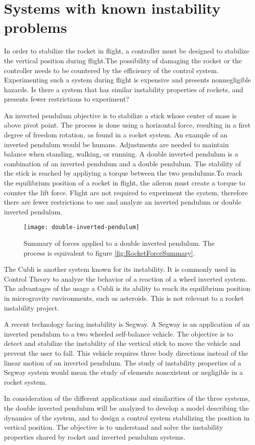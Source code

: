 \section{Systems with known instability problems}
\graphicspath{{figures/"Preanalysis&Requirement"/SimilarSystems/}}
In order to stabilize the rocket in flight, a controller must be designed to stabilize the vertical position during flight.The possibility of damaging the rocket or the controller needs to be countered by the efficiency of the control system. Experimenting such a system during flight is expensive and presents nonnegligible hazards.
Is there a system that has similar instability properties of rockets, and presents fewer restrictions to experiment?

An inverted pendulum objective is to stabilize a stick whose center of mass is above pivot point. The process is done using a horizontal force, resulting in a first degree of freedom rotation, as found in a rocket system. An example of an inverted pendulum would be humans. Adjustments are needed to maintain balance when standing, walking, or running. 
A double inverted pendulum is a combination of an inverted pendulum and a double pendulum. The stability of the stick is reached by appliying a torque between the two pendulums.To reach the equilibrium position of a rocket in flight, the aileron must create a torque to counter the lift force. Flight are not required to experiment the system, therefore there are fewer restrictions to use and analyze an inverted pendulum or double inverted pendulum. 

\begin{figure}[htbp]
	\centering
	\texttt{[image: double-inverted-pendulum]}
	\caption{Summary of forces applied to a double inverted pendulum. The process is equivalent to figure  \vref{fig:RocketForceSummary}.}
	\label{fig:DoubleInvertedPendulum}
\end{figure}


The Cubli is another system known for its instability. It is commonly used in Control Theory to analyze the behavior of a reaction of a wheel inverted system. The advantages of the usage a Cubli is its ability to reach its equilibrium position in microgravity environments, such as asteroids. This is not relevant to a rocket instability project.

A recent technology facing instability is Segway. A Segway is an application of an inverted pendulum to a two wheeled self-balance vehicle. The objective is to detect and stabilize the instability of the vertical stick to move the vehicle and prevent the user to fall. This vehicle requires three body directions instead of the linear motion of an inverted pendulum. The study of instability properties of a Segway system would mean the study of elements nonexistent or negligible in a rocket system.

In consideration of the different applications and similarities of the three systems, the double inverted pendulum will be analyzed to develop a model describing the dynamics of the system, and to design a control system stabilizing the position in vertical position. The objective is to understand and solve the instability properties shared by rocket and inverted pendulum systems.

